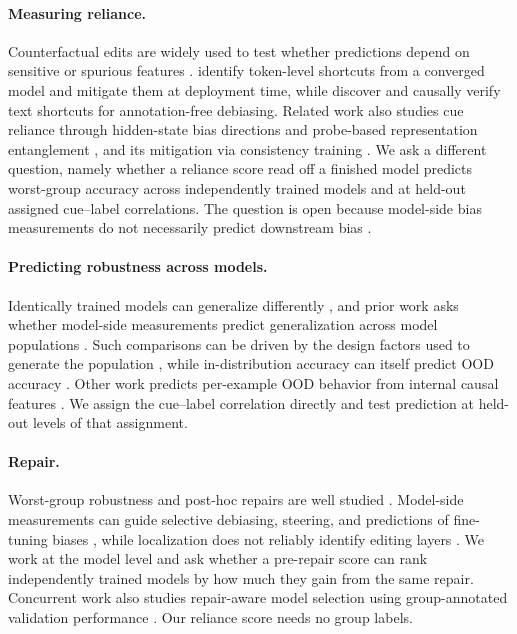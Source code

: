 \documentclass[11pt]{article}
\begin{document}
\paragraph{Measuring reliance.}
Counterfactual edits are widely used to test whether predictions depend on
sensitive or spurious features
\citep{garg2019ctf,prabhakaran2019perturbation,veitch2021counterfactual}.
\citet{guardrail2026shortcuts} identify token-level shortcuts from a converged
model and mitigate them at deployment time, while \citet{ravuru2026unmask}
discover and causally verify text shortcuts for annotation-free debiasing. Related work also studies cue reliance through hidden-state bias
directions and probe-based representation entanglement
\citep{gupta2026alignment,entangle2026probe}, and its mitigation via consistency training \citep{chua2025biasaugmentedconsistencytrainingreduces,imran2026consistencytrainingmitigatingobfuscation}. We ask a different question, namely whether a reliance score read off a
finished model predicts worst-group accuracy across independently trained
models and at held-out assigned cue--label correlations. The question is open
because model-side bias measurements do not necessarily predict downstream
bias
\citep{goldfarbtarrant2021intrinsic,cao2022intrinsic}.

\paragraph{Predicting robustness across models.}
Identically trained models can generalize differently
\citep{mccoy2020feather,damour2020underspecification}, and prior work asks
whether model-side measurements predict generalization across model populations
\citep{jiang2020fantastic,li2026interpretation}. Such comparisons can be driven
by the design factors used to generate the population
\citep{dziugaite2020search}, while in-distribution accuracy can itself predict
OOD accuracy \citep{miller2021accuracyline}. Other work predicts per-example OOD behavior from internal causal features
\citep{huang2025internal}. We assign the cue--label correlation directly and
test prediction at held-out levels of that assignment.

\paragraph{Repair.}
Worst-group robustness and post-hoc repairs are well studied
\citep{sagawa2020groupdro,liu2021jtt,kirichenko2023dfr,qiu2023afr,
belrose2023leace}. Model-side measurements can guide selective debiasing,
steering, and predictions of fine-tuning biases
\citep{kuzmin2025selective,steering2026predicting,lovering2021predicting},
while localization does not reliably identify editing layers
\citep{hase2023localization}. We work at the model level and ask whether a pre-repair score can rank
independently trained models by how much they gain from the same repair. Concurrent work also studies repair-aware model selection using group-annotated
validation performance \citep{wang2026prome}. Our reliance score needs no group labels.
\end{document}
